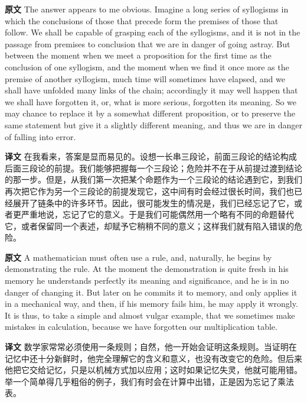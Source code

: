 \documentclass[UTF8]{ctexart}
\newenvironment{english}{\par\small\noindent\textbf{原文}\quad\ignorespaces}{\par}
\newenvironment{zhtranslation}{\par\noindent\textbf{译文}\quad\ignorespaces}{\par\vspace{0.35em}}
\begin{document}
\begin{english}
The answer appears to me obvious. Imagine a long series of syllogisms in which the conclusions of those that precede form the premises of those that follow. We shall be capable of grasping each of the syllogisms, and it is not in the passage from premises to conclusion that we are in danger of going astray. But between the moment when we meet a proposition for the first time as the conclusion of one syllogism, and the moment when we find it once more as the premise of another syllogism, much time will sometimes have elapsed, and we shall have unfolded many links of the chain; accordingly it may well happen that we shall have forgotten it, or, what is more serious, forgotten its meaning. So we may chance to replace it by a somewhat different proposition, or to preserve the same statement but give it a slightly different meaning, and thus we are in danger of falling into error.
\end{english}
\begin{zhtranslation}
在我看来，答案是显而易见的。设想一长串三段论，前面三段论的结论构成后面三段论的前提。我们能够把握每一个三段论；危险并不在于从前提过渡到结论的那一步。但是，从我们第一次把某个命题作为一个三段论的结论遇到它，到我们再次把它作为另一个三段论的前提发现它，这中间有时会经过很长时间，我们也已经展开了链条中的许多环节。因此，很可能发生的情况是，我们已经忘记了它，或者更严重地说，忘记了它的意义。于是我们可能偶然用一个略有不同的命题替代它，或者保留同一个表述，却赋予它稍稍不同的意义；这样我们就有陷入错误的危险。\end{zhtranslation}

\begin{english}
A mathematician must often use a rule, and, naturally, he begins by demonstrating the rule. At the moment the demonstration is quite fresh in his memory he understands perfectly its meaning and significance, and he is in no danger of changing it. But later on he commits it to memory, and only applies it in a mechanical way, and then, if his memory fails him, he may apply it wrongly. It is thus, to take a simple and almost vulgar example, that we sometimes make mistakes in calculation, because we have forgotten our multiplication table.
\end{english}
\begin{zhtranslation}
数学家常常必须使用一条规则；自然，他一开始会证明这条规则。当证明在记忆中还十分新鲜时，他完全理解它的含义和意义，也没有改变它的危险。但后来他把它交给记忆，只是以机械方式加以应用；这时如果记忆失灵，他就可能用错。举一个简单得几乎粗俗的例子，我们有时会在计算中出错，正是因为忘记了乘法表。\end{zhtranslation}
\end{document}
